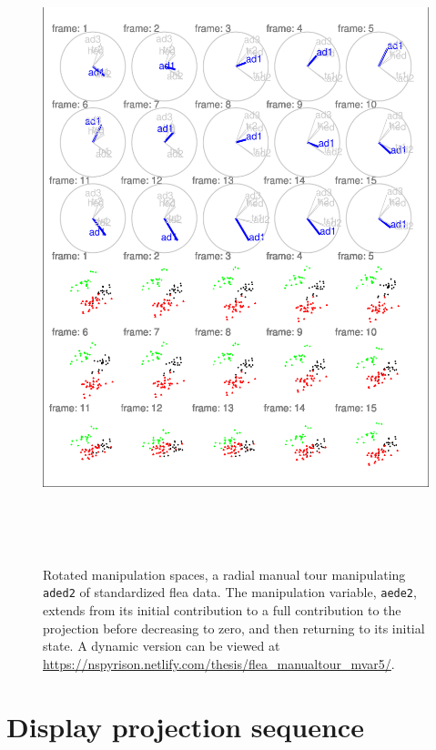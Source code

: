 \documentclass{monashthesis}
\begin{document}
\begin{figure}

{\centering \includegraphics[width=6in,height=7.2in]{thesis_files/figure-latex/step3-1} 

}

\caption{Rotated manipulation spaces, a radial manual tour
manipulating \texttt{aded2} of standardized flea data. The manipulation
variable, \texttt{aede2}, extends from its initial contribution to a
full contribution to the projection before decreasing to zero, and then
returning to its initial state. A dynamic version can be viewed at
\url{https://nspyrison.netlify.com/thesis/flea_manualtour_mvar5/}.}\label{fig:step3}
\end{figure}

\section{Display projection sequence}\label{display-projection-sequence}
\end{document}
